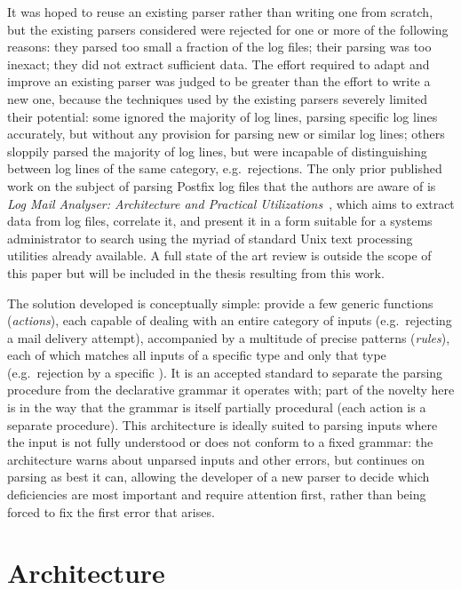 \documentclass{svmult}
\begin{document}
It was hoped to reuse an existing parser rather than writing one from
scratch, but the existing parsers considered were rejected for one or more
of the following reasons: they parsed too small a fraction of the log
files; their parsing was too inexact; they did not extract sufficient data.
The effort required to adapt and improve an existing parser was judged to
be greater than the effort to write a new one, because the techniques used
by the existing parsers severely limited their potential: some ignored the
majority of log lines, parsing specific log lines accurately, but without
any provision for parsing new or similar log lines; others sloppily parsed
the majority of log lines, but were incapable of distinguishing between log
lines of the same category, e.g.\ rejections.  The only prior published
work on the subject of parsing Postfix log files that the authors are aware
of is \textit{Log Mail Analyser: Architecture and Practical
Utilizations\/}~\cite{log-mail-analyser}, which aims to extract data from
log files, correlate it, and present it in a form suitable for a systems
administrator to search using the myriad of standard Unix text processing
utilities already available.  A full state of the art review is outside the
scope of this paper but will be included in the thesis resulting from this
work.

The solution developed is conceptually simple: provide a few generic
functions (\textit{actions\/}), each capable of dealing with an entire
category of inputs (e.g.\ rejecting a mail delivery attempt), accompanied by a multitude of
precise patterns (\textit{rules\/}), each of which matches all inputs of
a specific type and only that type (e.g.\ rejection by a specific
\DNSBL{}).  It is an accepted standard to separate the parsing procedure
from the declarative grammar it operates with; part of the novelty here is
in the way that the grammar is itself partially procedural (each action is
a separate procedure).  This architecture is ideally suited to parsing
inputs where the input is not fully understood or does not conform to a
fixed grammar: the architecture warns about unparsed inputs and other
errors, but continues on parsing as best it can, allowing the developer of
a new parser to decide which deficiencies are most important and require
attention first, rather than being forced to fix the first error that
arises.

\section{Architecture}
\end{document}
